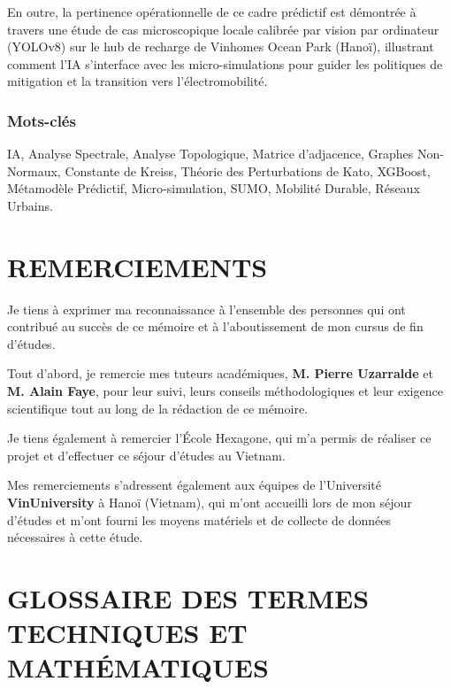 \documentclass[10pt, a4paper]{article}
\begin{document}
En outre, la pertinence opérationnelle de ce cadre prédictif est
démontrée à travers une étude de cas microscopique locale calibrée par
vision par ordinateur (YOLOv8) sur le hub de recharge de Vinhomes Ocean
Park (Hanoï), illustrant comment l'IA s'interface avec les
micro-simulations pour guider les politiques de mitigation et la
transition vers l'électromobilité.

\subsubsection{Mots-clés}\label{mots-cluxe9s}

IA, Analyse Spectrale, Analyse Topologique, Matrice d'adjacence, Graphes
Non-Normaux, Constante de Kreiss, Théorie des Perturbations de Kato,
XGBoost, Métamodèle Prédictif, Micro-simulation, SUMO, Mobilité Durable,
Réseaux Urbains.

\newpage

\section{REMERCIEMENTS}\label{remerciements}

Je tiens à exprimer ma reconnaissance à l'ensemble des personnes qui ont
contribué au succès de ce mémoire et à l'aboutissement de mon cursus de
fin d'études.

Tout d'abord, je remercie mes tuteurs académiques, \textbf{M. Pierre
Uzarralde} et \textbf{M. Alain Faye}, pour leur suivi, leurs conseils
méthodologiques et leur exigence scientifique tout au long de la
rédaction de ce mémoire.

Je tiens également à remercier l'École Hexagone, qui m'a permis de
réaliser ce projet et d'effectuer ce séjour d'études au Vietnam.

Mes remerciements s'adressent également aux équipes de l'Université
\textbf{VinUniversity} à Hanoï (Vietnam), qui m'ont accueilli lors de
mon séjour d'études et m'ont fourni les moyens matériels et de collecte
de données nécessaires à cette étude.

\newpage

\section{GLOSSAIRE DES TERMES TECHNIQUES ET
MATHÉMATIQUES}\label{glossaire-des-termes-techniques-et-mathuxe9matiques}
\end{document}
